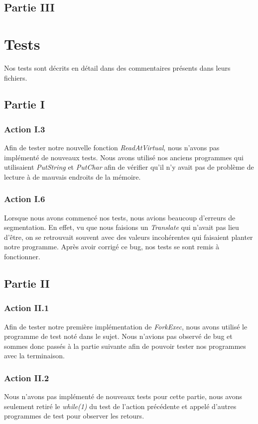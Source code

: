 \documentclass{article}
\begin{document}
\subsection{Partie III}


\section{Tests}
Nos tests sont décrits en détail dans des commentaires présents dans leurs fichiers.
\subsection{Partie I}
\subsubsection{Action I.3}
Afin de tester notre nouvelle fonction \textit{ReadAtVirtual}, nous n'avons pas implémenté de nouveaux tests. Nous avons utilisé nos anciens programmes 
qui utilisaient \textit{PutString} et \textit{PutChar} afin de vérifier qu'il n'y avait pas de problème de lecture à de mauvais endroits de la mémoire.

\subsubsection{Action I.6}
Lorsque nous avons commencé nos tests, nous avions beaucoup d'erreurs de segmentation. En effet, vu que nous faisions un \textit{Translate} qui n'avait pas lieu d'être, on se retrouvait souvent
avec des valeurs incohérentes qui faisaient planter notre programme. Après avoir corrigé ce bug, nos tests se sont remis à fonctionner.

\subsection{Partie II}

\subsubsection{Action II.1}
Afin de tester notre première implémentation de \textit{ForkExec}, nous avons utilisé le programme de test noté dans le sujet.
Nous n'avions pas observé de bug et sommes donc passés à la partie suivante afin de pouvoir tester nos programmes avec la terminaison.

\subsubsection{Action II.2}
Nous n'avons pas implémenté de nouveaux tests pour cette partie, nous avons seulement retiré le \textit{while(1)} du test de 
l'action précédente et appelé d'autres programmes de test pour observer les retours.
\end{document}
